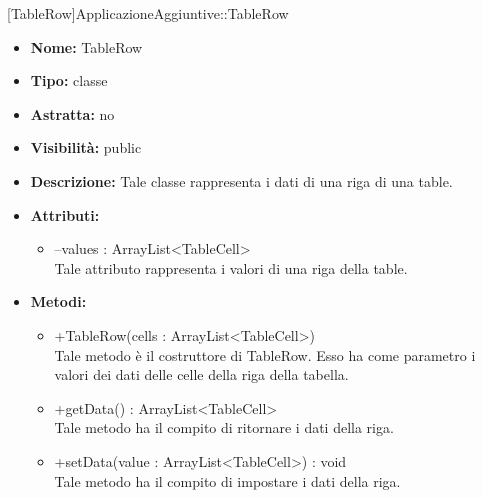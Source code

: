 			[TableRow]{ApplicazioneAggiuntive::TableRow}
			

	
			
			\begin{itemize}
			\item \textbf{Nome:} TableRow
			\item \textbf{Tipo:} classe
			
		\item \textbf{Astratta:}
		no
			\item \textbf{Visibilità:} public
			\item \textbf{Descrizione:} Tale classe rappresenta i dati di una riga di una table.
			\item \textbf{Attributi:}
				\begin{itemize}
				\setlength{\itemsep}{5pt}
				
					\item[\ding{111}] {--values : ArrayList<TableCell>} \\ [1mm] Tale attributo rappresenta i valori di una riga della table.
				\end{itemize}
		
			\item \textbf{Metodi:}
				\begin{itemize}
				\setlength{\itemsep}{5pt}
				
					\item[\ding{111}] {{+TableRow(cells : ArrayList<TableCell>)}} \\ [1mm] Tale metodo è il costruttore di TableRow. Esso ha come parametro i valori dei dati delle celle della riga della tabella.
					\item[\ding{111}] {{+getData() : ArrayList<TableCell>}} \\ [1mm] Tale metodo ha il compito di ritornare i dati della riga.
					\item[\ding{111}] {{+setData(value : ArrayList<TableCell>) : void}} \\ [1mm] Tale metodo ha il compito di impostare i dati della riga.
				\end{itemize}
		
			\end{itemize}
	
